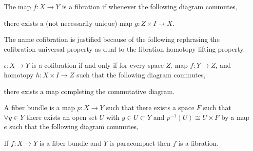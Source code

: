 \documentclass[12pt]{extarticle}
\begin{document}
\begin{definition}
The map $f : X \to Y$ is a fibration if whenever the following diagram commutes,
\begin{center}
\end{center}
there exists a (not necessarily unique) map $g: Z \times I \to X$. 
\end{definition}

\begin{rmk}
The name cofibration is justified because of the following rephrasing the cofibration universal property as dual to the fibration homotopy lifting property.
\end{rmk}

\begin{lemma}
$\iota : X \to Y$ is a cofibration if and only if for every space $Z$, map $f : Y \to Z$, and homotopy $h : X \times I \to Z$ such that the following diagram commutes,
\begin{center}
\end{center}  
there exists a map completing the commutative diagram.
\end{lemma}

\begin{definition}
A fiber bundle is a map $p : X \to Y$ such that there exists a space $F$ such that $\forall y \in Y$ there exists an open set $U$ with $y \in U \subset Y$ and $p^{-1}(U) \cong U \times F$ by a map $e$ such that the following diagram commutes,
\begin{center}
\end{center}
\end{definition}

\begin{theorem}
If $f : X \to Y$ is a fiber bundle and $Y$ is paracompact then $f$ is a fibration.
\end{theorem}
\end{document}
